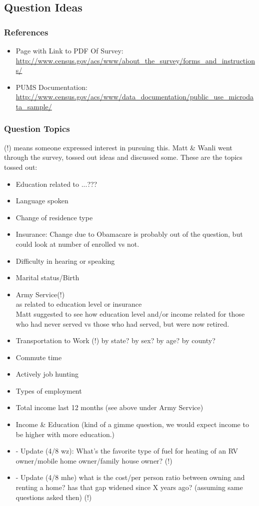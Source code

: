 \documentclass{article}
\begin{document}
\subsection{Question Ideas}
\subsubsection{References}
\begin{itemize}
\item Page with Link to PDF Of Survey: \url{http://www.census.gov/acs/www/about_the_survey/forms_and_instructions/}
\item PUMS Documentation: \url{http://www.census.gov/acs/www/data_documentation/public_use_microdata_sample/}
\end{itemize}

\subsubsection{Question Topics}
(!) means someone expressed interest in pursuing this. Matt \& Wanli went through the survey, tossed out ideas and discussed some. These are the topics tossed out:

\begin{itemize}
\item Education related to ...???
\item Language spoken
\item Change of residence type
\item Insurance: Change due to Obamacare is probably out of the question, but could look at number of enrolled vs not.
\item Difficulty in hearing or speaking
\item Marital status/Birth
\item Army Service(!)\\
  as related to education level or insurance\\
  Matt suggested to see how education level and/or income related for those who had never served vs those who had served, but were now retired.
\item Transportation to Work (!)
  by state? by sex? by age? by county? 
\item Commute time
\item Actively job hunting
\item Types of employment
\item Total income last 12 months (see above under Army Service)
\item Income \& Education (kind of a gimme question, we would expect income to be higher with more education.)
\item - Update (4/8 wz): What's the favorite type of fuel for heating of an RV owner/mobile home owner/family house owner? (!)
\item - Update (4/8 mhe) what is the cost/per person ratio between owning and renting a home? has that gap widened since X years ago? (assuming same questions asked then) (!)
\end{itemize}
\end{document}
